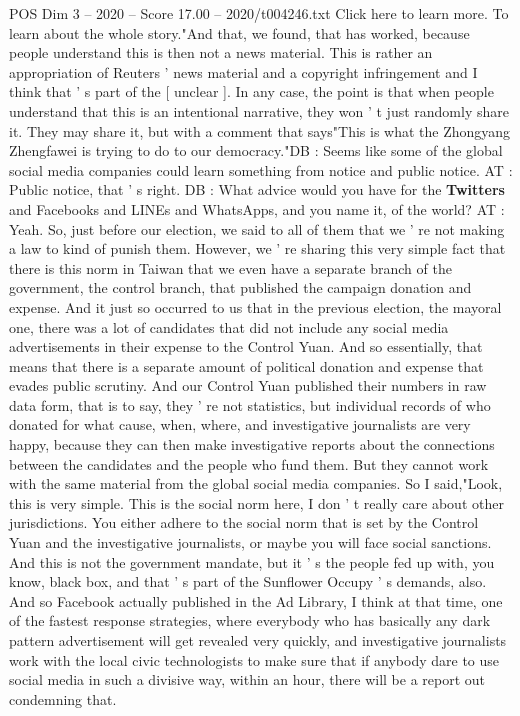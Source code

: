 \begin{textsample}{POS Dim 3 – 2020 – Score 17.00 – 2020/t004246.txt}
Click here to learn more.
To learn about the whole story."And that, we found, that has worked, because people understand this is then not a news material.
This is rather an appropriation of Reuters ' news material and a copyright infringement and I think that ' s part of the [ unclear ].
In any case, the point is that when people understand that this is an intentional narrative, they won ' t just randomly share it.
They may share it, but with a comment that says"This is what the Zhongyang Zhengfawei is trying to do to our democracy."DB : Seems like some of the global social media companies could learn something from notice and public notice.
AT : Public notice, that ' s right.
DB : What advice would you have for the \textbf{Twitters} and Facebooks and LINEs and WhatsApps, and you name it, of the world?
AT : Yeah.
So, just before our election, we said to all of them that we ' re not making a law to kind of punish them.
However, we ' re sharing this very simple fact that there is this norm in Taiwan that we even have a separate branch of the government, the control branch, that published the campaign donation and expense.
And it just so occurred to us that in the previous election, the mayoral one, there was a lot of candidates that did not include any social media advertisements in their expense to the Control Yuan.
And so essentially, that means that there is a separate amount of political donation and expense that evades public scrutiny.
And our Control Yuan published their numbers in raw data form, that is to say, they ' re not statistics, but individual records of who donated for what cause, when, where, and investigative journalists are very happy, because they can then make investigative reports about the connections between the candidates and the people who fund them.
But they cannot work with the same material from the global social media companies.
So I said,"Look, this is very simple.
This is the social norm here, I don ' t really care about other jurisdictions.
You either adhere to the social norm that is set by the Control Yuan and the investigative journalists, or maybe you will face social sanctions.
And this is not the government mandate, but it ' s the people fed up with, you know, black box, and that ' s part of the Sunflower Occupy ' s demands, also.
And so Facebook actually published in the Ad Library, I think at that time, one of the fastest response strategies, where everybody who has basically any dark pattern advertisement will get revealed very quickly, and investigative journalists work with the local civic technologists to make sure that if anybody dare to use social media in such a divisive way, within an hour, there will be a report out condemning that.

\end{textsample}
